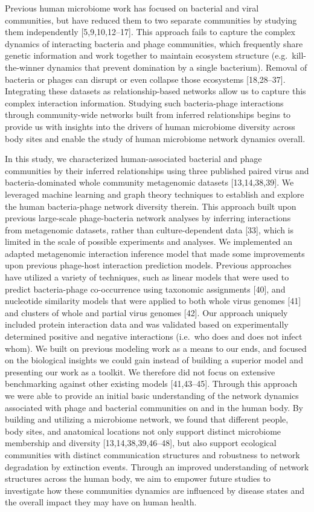 \documentclass[12pt,]{article}
\begin{document}
Previous human microbiome work has focused on bacterial and viral
communities, but have reduced them to two separate communities by
studying them independently {[}5,9,10,12--17{]}. This approach fails to
capture the complex dynamics of interacting bacteria and phage
communities, which frequently share genetic information and work
together to maintain ecosystem structure (e.g.~kill-the-winner dynamics
that prevent domination by a single bacterium). Removal of bacteria or
phages can disrupt or even collapse those ecosystems {[}18,28--37{]}.
Integrating these datasets as relationship-based networks allow us to
capture this complex interaction information. Studying such
bacteria-phage interactions through community-wide networks built from
inferred relationships begins to provide us with insights into the
drivers of human microbiome diversity across body sites and enable the
study of human microbiome network dynamics overall.

In this study, we characterized human-associated bacterial and phage
communities by their inferred relationships using three published paired
virus and bacteria-dominated whole community metagenomic datasets
{[}13,14,38,39{]}. We leveraged machine learning and graph theory
techniques to establish and explore the human bacteria-phage network
diversity therein. This approach built upon previous large-scale
phage-bacteria network analyses by inferring interactions from
metagenomic datasets, rather than culture-dependent data {[}33{]}, which
is limited in the scale of possible experiments and analyses. We
implemented an adapted metagenomic interaction inference model that made
some improvements upon previous phage-host interaction prediction
models. Previous approaches have utilized a variety of techniques, such
as linear models that were used to predict bacteria-phage co-occurrence
using taxonomic assignments {[}40{]}, and nucleotide similarity models
that were applied to both whole virus genomes {[}41{]} and clusters of
whole and partial virus genomes {[}42{]}. Our approach uniquely included
protein interaction data and was validated based on experimentally
determined positive and negative interactions (i.e.~who does and does
not infect whom). We built on previous modeling work as a means to our
ends, and focused on the biological insights we could gain instead of
building a superior model and presenting our work as a toolkit. We
therefore did not focus on extensive benchmarking against other existing
models {[}41,43--45{]}. Through this approach we were able to provide an
initial basic understanding of the network dynamics associated with
phage and bacterial communities on and in the human body. By building
and utilizing a microbiome network, we found that different people, body
sites, and anatomical locations not only support distinct microbiome
membership and diversity {[}13,14,38,39,46--48{]}, but also support
ecological communities with distinct communication structures and
robustness to network degradation by extinction events. Through an
improved understanding of network structures across the human body, we
aim to empower future studies to investigate how these communities
dynamics are influenced by disease states and the overall impact they
may have on human health.
\end{document}

